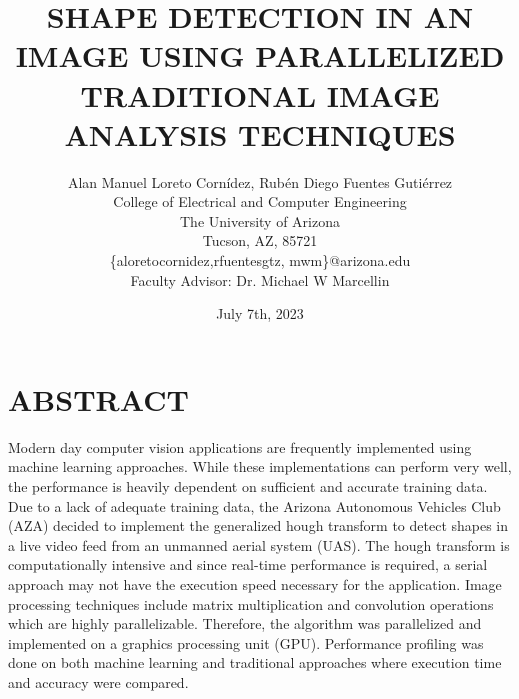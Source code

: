 \documentclass[12pt]{article}
\title{\Large \vspace{-0.5in}
\MakeUppercase{Shape Detection in an Image using Parallelized Traditional Image Analysis Techniques}}
\author{ Alan Manuel Loreto Cornídez, Rubén Diego Fuentes Gutiérrez\\
    \normalsize College of Electrical and Computer Engineering\\
    \normalsize The University of Arizona\\ 
    \normalsize Tucson, AZ, 85721\\
    \normalsize \{aloretocornidez,rfuentesgtz, mwm\}@arizona.edu\\[6pt]
    Faculty Advisor: Dr. Michael W Marcellin
  }
\date{July 7th, 2023}
\begin{document}
\maketitle

\section{\MakeUppercase{Abstract}}
\noindent
Modern day computer vision applications are frequently implemented using machine learning approaches.
While these implementations can perform very well, the performance is heavily dependent on sufficient and accurate training data.
Due to a lack of adequate training data, the Arizona Autonomous Vehicles Club (AZA) decided to implement the generalized hough transform to detect shapes in a live video feed from an unmanned aerial system (UAS). 
The hough transform is computationally intensive and since real-time performance is required, a serial approach may not have the execution speed necessary for the application.
Image processing techniques include matrix multiplication and convolution operations which are highly parallelizable.
Therefore, the algorithm was parallelized and implemented on a graphics processing unit (GPU).
Performance profiling was done on both machine learning and traditional approaches where execution time and accuracy were compared.
\end{document}

